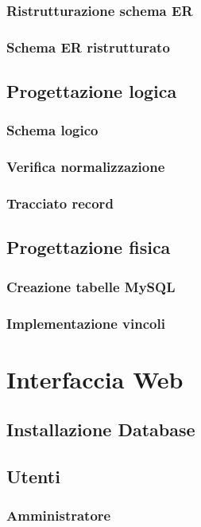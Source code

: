 \documentclass{article}
\begin{document}
\subsubsection{Ristrutturazione schema ER}
\subsubsection{Schema ER ristrutturato}

\subsection{Progettazione logica}
\subsubsection{Schema logico}
\subsubsection{Verifica normalizzazione}
\subsubsection{Tracciato record}

\subsection{Progettazione fisica}
\subsubsection{Creazione tabelle MySQL}
\subsubsection{Implementazione vincoli}

\section{Interfaccia Web}
\subsection{Installazione Database}
\subsection{Utenti}
\subsubsection{Amministratore}
\end{document}
